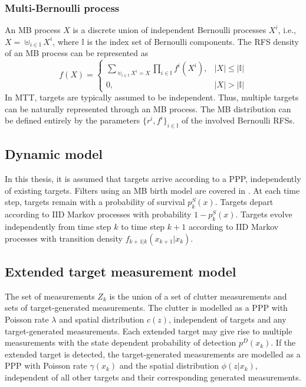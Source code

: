 \subsubsection{Multi-Bernoulli process}
An MB process $X$ is a discrete union of independent Bernoulli processes $X^i$, i.e., $X = \uplus_{i\in\mathbb{I}}X^i$, where $\mathbb{I}$ is the index set of Bernoulli components. The RFS density of an MB process can be represented as \cite{pmbmextended2}
\begin{equation}
f(X) = 
\begin{cases}
\sum_{\uplus_{i\in\mathbb{I}}X^i=X}\prod_{i\in\mathbb{I}}f^i(X^i), & |X| \leq |\mathbb{I}| \\
0, & |X| > |\mathbb{I}|
\end{cases}
\label{eq:mb}
\end{equation}
In MTT, targets are typically assumed to be independent. Thus, multiple targets can be naturally represented through an MB process. The MB distribution can be defined entirely by the parameters $\{r^i,f^i\}_{i\in\mathbb{I}}$ of the involved Bernoulli RFSs.

\subsection{Dynamic model}
In this thesis, it is assumed that targets arrive according to a PPP, independently of existing targets. Filters using an MB birth model are covered in \cite{lmbextended}. At each time step, targets remain with a probability of survival $p^S_k(x)$. Targets depart according to IID Markov processes with probability $1-p^S_k(x)$. Targets evolve independently from time step $k$ to time step $k+1$ according to IID Markov processes with transition density $f_{k+1|k}(x_{k+1}|x_{k})$. 

\subsection{Extended target measurement model}
The set of measurements $Z_k$ is the union of a set of clutter measurements and sets of target-generated measurements. The clutter is modelled as a PPP with Poisson rate $\lambda$ and spatial distribution $c(z)$, independent of targets and any target-generated measurements. Each extended target may give rise to multiple measurements with the state dependent probability of detection $p^D(x_k)$. If the extended target is detected, the target-generated measurements are modelled as a PPP with Poisson rate $\gamma(x_k)$ and the spatial distribution $\phi(z|x_k)$, independent of all other targets and their corresponding generated measurements. 

